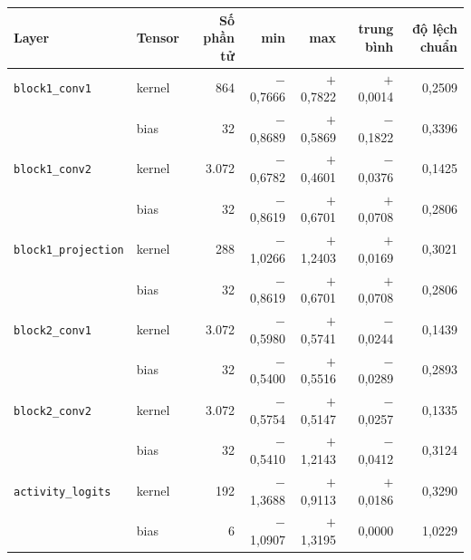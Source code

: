 \begin{tabular}{llrrrrr}
\toprule
Layer & Tensor & Số phần tử & min & max & trung bình & độ lệch chuẩn \\
\midrule
\texttt{block1\_conv1} & kernel & 864 & $-$0,7666 & $+$0,7822 & $+$0,0014 & 0,2509 \\
 & bias & 32 & $-$0,8689 & $+$0,5869 & $-$0,1822 & 0,3396 \\
\addlinespace[2pt]
\texttt{block1\_conv2} & kernel & 3.072 & $-$0,6782 & $+$0,4601 & $-$0,0376 & 0,1425 \\
 & bias & 32 & $-$0,8619 & $+$0,6701 & $+$0,0708 & 0,2806 \\
\addlinespace[2pt]
\texttt{block1\_projection} & kernel & 288 & $-$1,0266 & $+$1,2403 & $+$0,0169 & 0,3021 \\
 & bias & 32 & $-$0,8619 & $+$0,6701 & $+$0,0708 & 0,2806 \\
\addlinespace[2pt]
\texttt{block2\_conv1} & kernel & 3.072 & $-$0,5980 & $+$0,5741 & $-$0,0244 & 0,1439 \\
 & bias & 32 & $-$0,5400 & $+$0,5516 & $-$0,0289 & 0,2893 \\
\addlinespace[2pt]
\texttt{block2\_conv2} & kernel & 3.072 & $-$0,5754 & $+$0,5147 & $-$0,0257 & 0,1335 \\
 & bias & 32 & $-$0,5410 & $+$1,2143 & $-$0,0412 & 0,3124 \\
\addlinespace[2pt]
\texttt{activity\_logits} & kernel & 192 & $-$1,3688 & $+$0,9113 & $+$0,0186 & 0,3290 \\
 & bias & 6 & $-$1,0907 & $+$1,3195 & 0,0000 & 1,0229 \\
\bottomrule
\end{tabular}
